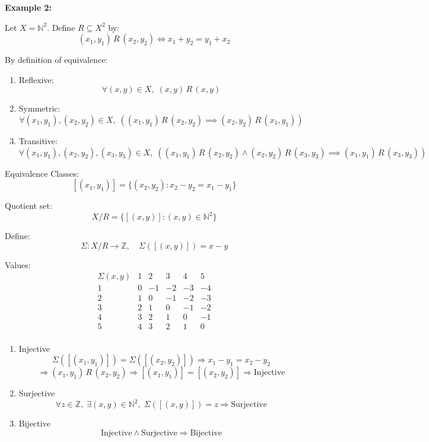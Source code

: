 \documentclass[12pt,a4paper,openany]{article}
\begin{document}
\textbf{Example 2:}

Let $X = \mathbb{N}^2$. Define $R \subseteq X^2$ by:
$$(x_1,y_1) \,R\, (x_2,y_2) \iff x_1 + y_2 = y_1 + x_2$$

By definition of equivalence:

\begin{enumerate}
\item Reflexive:
   \[\forall (x,y) \in X, \; (x,y) \,R\, (x,y)\]

\item Symmetric:
   \[\forall (x_1,y_1),(x_2,y_2) \in X, \; ((x_1,y_1) \,R\, (x_2,y_2) \implies (x_2,y_2) \,R\, (x_1,y_1))\]

\item Transitive:
   \[\forall (x_1,y_1),(x_2,y_2),(x_3,y_3) \in X, \; ((x_1,y_1) \,R\, (x_2,y_2) \wedge (x_2,y_2) \,R\, (x_3,y_3) \implies (x_1,y_1) \,R\, (x_3,y_3))\]
\end{enumerate}

Equivalence Classes:
\[[(x_1,y_1)] = \{(x_2,y_2) : x_2 - y_2 = x_1 - y_1\}\]

Quotient set:
\[X/R = \{[(x,y)] : (x,y) \in \mathbb{N}^2\}\]

Define:
\[\Sigma: X/R \to \mathbb{Z}, \quad \Sigma([(x,y)]) = x - y\]

Values:
\[
\begin{array}{c|ccccc} 
\Sigma(x,y) & 1 & 2 & 3 & 4 & 5 \\
\hline
1 & 0 & -1 & -2 & -3 & -4 \\
2 & 1 & 0 & -1 & -2 & -3 \\
3 & 2 & 1 & 0 & -1 & -2 \\
4 & 3 & 2 & 1 & 0 & -1 \\
5 & 4 & 3 & 2 & 1 & 0 \\
\end{array}
\]

\begin{enumerate}
\item Injective
   \[\Sigma([(x_1,y_1)]) = \Sigma([(x_2,y_2)]) \Rightarrow x_1 - y_1 = x_2 - y_2\] 
   \[\Rightarrow (x_1,y_1) \,R\, (x_2,y_2) \Rightarrow [(x_1,y_1)] = [(x_2,y_2)]\Rightarrow \text{Injective}\]

\item Surjective
   $$
   \forall z \in \mathbb{Z}, \; \exists (x,y) \in \mathbb{N}^2, \; \Sigma([(x,y)]) = z \Rightarrow \text{Surjective}
   $$

\item Bijective
   $$
   \text{Injective} \wedge \text{Surjective} \Rightarrow \text{Bijective}
   $$
\end{enumerate}
\end{document}
